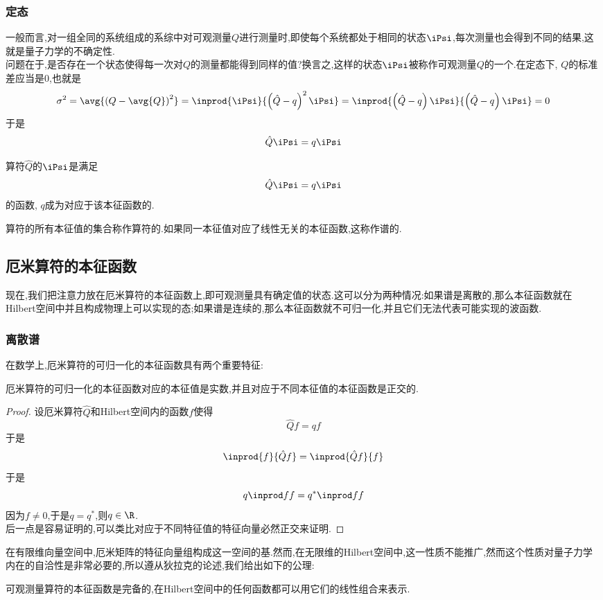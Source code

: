 \documentclass{ctexart}
\begin{document}
\subsubsection{定态}
一般而言,对一组全同的系统组成的系综中对可观测量$Q$进行测量时,即使每个系统都处于相同的状态$\iPsi$,每次测量也会得到不同的结果,这就是量子力学的不确定性.\\
\indent 问题在于,是否存在一个状态使得每一次对$Q$的测量都能得到同样的值?换言之,这样的状态$\iPsi$被称作可观测量$Q$的一个.在定态下, $Q$的标准差应当是$0$,也就是
\[\sigma^2=\avg{\left(Q-\avg{Q}\right)^2}=\inprod{\iPsi}{\left(\hat{Q}-q\right)^2\iPsi}=\inprod{\left(\hat{Q}-q\right)\iPsi}{\left(\hat{Q}-q\right)\iPsi}=0\]
于是
\[\hat{Q}\iPsi=q\iPsi\]
\begin{definition}[本征值]
    算符$\hat{Q}$的$\iPsi$是满足
    \[\hat{Q}\iPsi=q\iPsi\]
    的函数, $q$成为对应于该本征函数的.
\end{definition}
\begin{definition}[谱和简并]
    算符的所有本征值的集合称作算符的.如果同一本征值对应了线性无关的本征函数,这称作谱的.
\end{definition}
\subsection{厄米算符的本征函数}
现在,我们把注意力放在厄米算符的本征函数上,即可观测量具有确定值的状态.这可以分为两种情况:如果谱是离散的,那么本征函数就在Hilbert空间中并且构成物理上可以实现的态;如果谱是连续的,那么本征函数就不可归一化,并且它们无法代表可能实现的波函数.
\subsubsection{离散谱}
在数学上,厄米算符的可归一化的本征函数具有两个重要特征:
\begin{theorem}[厄米算符的本征函数的性质]
    厄米算符的可归一化的本征函数对应的本征值是实数,并且对应于不同本征值的本征函数是正交的.
\end{theorem}
\begin{proof}
    设厄米算符$\hat{Q}$和Hilbert空间内的函数$f$使得
    \[\hat{Q}f=qf\]
    于是
    \[\inprod{f}{\hat{Q}f}=\inprod{\hat{Q}f}{f}\]
    于是
    \[q\inprod ff=q^\ast\inprod ff\]
    因为$f\neq0$,于是$q=q^\ast$,则$q\in\R$.\\
    后一点是容易证明的,可以类比对应于不同特征值的特征向量必然正交来证明.
\end{proof}
在有限维向量空间中,厄米矩阵的特征向量组构成这一空间的基.然而,在无限维的Hilbert空间中,这一性质不能推广,然而这个性质对量子力学内在的自洽性是非常必要的,所以遵从狄拉克的论述,我们给出如下的公理:
\begin{theorem}
    可观测量算符的本征函数是完备的,在Hilbert空间中的任何函数都可以用它们的线性组合来表示.
\end{theorem}
\end{document}
